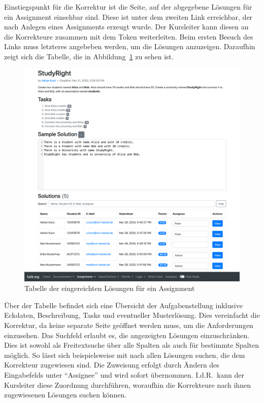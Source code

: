 Einstiegspunkt für die Korrektur ist die Seite, auf der abgegebene Lösungen für ein Assignment einsehbar sind.
Diese ist unter dem zweiten Link erreichbar, der nach Anlegen eines Assignments erzeugt wurde.
Der Kursleiter kann diesen an die Korrekteure zusammen mit dem Token weiterleiten.
Beim ersten Besuch des Links muss letzteres angebeben werden, um die Lösungen anzuzeigen.
Daraufhin zeigt sich die Tabelle, die in Abbildung~\ref{fig:solution-table} zu sehen ist.

\begin{figure}
    \centering
    \includegraphics[width=\textwidth]{chapter/fulib.org/img/solution-table.png}
    \caption{Tabelle der eingereichten Lösungen für ein Assignment}
    \label{fig:solution-table}
\end{figure}

Über der Tabelle befindet sich eine Übersicht der Aufgabenstellung inklusive Eckdaten, Beschreibung, Tasks und eventueller Musterlösung.
Dies vereinfacht die Korrektur, da keine separate Seite geöffnet werden muss, um die Anforderungen einzusehen.
Das Suchfeld erlaubt es, die angezeigten Lösungen einzuschränken.
Dies ist sowohl als Freitextsuche über alle Spalten als auch für bestimmte Spalten möglich.
So lässt sich beispielsweise mit  nach allen Lösungen suchen, die dem Korrekteur  zugewiesen sind.
Die Zuweisung erfolgt durch Ändern des Eingabefelds unter ``Assignee'' und wird sofort übernommen.
I.d.R.\ kann der Kursleiter diese Zuordnung durchführen, woraufhin die Korrekteure nach ihnen zugewiesenen Lösungen suchen können.


